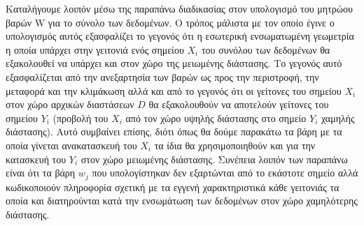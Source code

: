 \par
Καταλήγουμε λοιπόν μέσω της παραπάνω διαδικασίας στον υπολογισμό του μητρώου βαρών \textlatin{W} για το σύνολο των δεδομένων. Ο τρόπος μάλιστα με τον οποίο έγινε ο υπολογισμός αυτός εξασφαλίζει το γεγονός ότι η εσωτερική ενσωματωμένη γεωμετρία η οποία υπάρχει στην γειτονιά ενός σημείου $X_{i}$ του συνόλου των δεδομένων θα εξακολουθεί να υπάρχει και στον χώρο της μειωμένης διάστασης. Το γεγονός αυτό εξασφαλίζεται από την ανεξαρτησία των βαρών ως προς την περιστροφή, την μεταφορά και την κλιμάκωση αλλά και από το γεγονός ότι οι γείτονες του σημείου $X_{i}$ στον χώρο αρχικών διαστάσεων $D$ θα εξακολουθούν να αποτελούν γείτονες του σημείου $Y_{i}$ (προβολή του $X_{i}$ από τον χώρο υψηλής διάστασης στο σημείο $Y_{i}$ χαμηλής διάστασης). Αυτό συμβαίνει επίσης, διότι όπως θα δούμε παρακάτω τα βάρη με τα οποία γίνεται ανακατασκευή του $X_{i}$ τα ίδια θα χρησιμοποιηθούν και για την κατασκευή του $Y_{i}$ στον χώρο μειωμένης διάστασης. Συνέπεια λοιπόν των παραπάνω είναι ότι τα βάρη $w_{j}$ που υπολογίστηκαν δεν εξαρτώνται από το εκάστοτε σημείο αλλά κωδικοποιούν πληροφορία σχετική με τα εγγενή χαρακτηριστικά κάθε γειτονιάς τα οποία και διατηρούνται κατά την ενσωμάτωση των δεδομένων στον χώρο χαμηλότερης διάστασης. 

